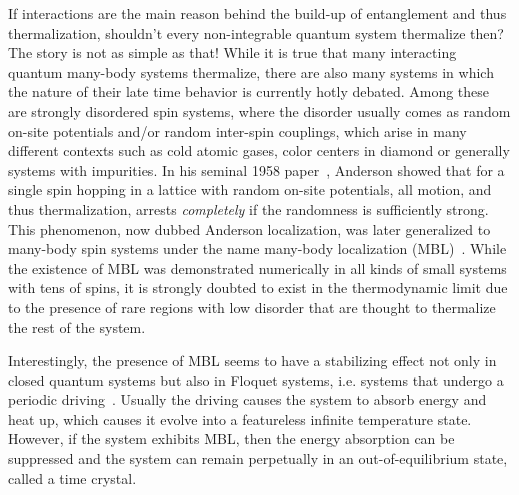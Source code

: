 
If interactions are the main reason behind the build-up of entanglement and thus thermalization, shouldn't every non-integrable quantum system thermalize then? The story is not as simple as that! While it is true that many interacting quantum many-body systems thermalize, there are also many systems in which the nature of their late time behavior is currently hotly debated. Among these are strongly disordered spin systems, where the disorder usually comes as random on-site potentials and/or random inter-spin couplings, which arise in many different contexts such as cold atomic gases, color centers in diamond or generally systems with impurities. 
In his seminal 1958 paper~\cite{andersonAbsenceDiffusionCertain1958}, Anderson showed that for a single spin hopping in a lattice with random on-site potentials, all motion, and thus thermalization, arrests \emph{completely} if the randomness is sufficiently strong.
This phenomenon, now dubbed Anderson localization, was later generalized to many-body spin systems under the name many-body localization (MBL)~\cite{fleishmanInteractionsAndersonTransition1980,baskoMetalinsulatorTransitionWeakly2006,gornyiInteractingElectronsDisordered2005,bauerAreaLawsManybody2013}.
While the existence of MBL was demonstrated numerically in all kinds of small systems with tens of spins, it is strongly doubted to exist in the thermodynamic limit due to the presence of rare regions with low disorder that are thought to thermalize the rest of the system. 


Interestingly, the presence of MBL seems to have a stabilizing effect not only in closed quantum systems but also in Floquet systems, i.e. systems that undergo a periodic driving~\cite{abaninTheoryManybodyLocalization2016,elsePrethermalPhasesMatter2017,bordiaPeriodicallyDrivingManyBody2017,elseDiscreteTimeCrystals2020a}.
Usually the driving causes the system to absorb energy and heat up, which causes it evolve into a featureless infinite temperature state. However, if the system exhibits MBL, then the energy absorption can be suppressed and the system can remain perpetually in an out-of-equilibrium state, called a time crystal.

